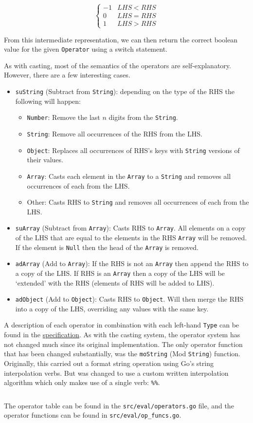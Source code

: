 \[ \begin{cases} 
    -1 & LHS < RHS \\
    0  & LHS = RHS \\
    1  & LHS > RHS 
 \end{cases}
\]

From this intermediate representation, we can then return the correct boolean value for the given \verb|Operator| using a switch statement.

As with casting, most of the semantics of the operators are self-explanatory. However, there are a few interesting cases.

\begin{itemize}
    \item \verb|suString| (Subtract from \verb|String|): depending on the type of the RHS the following will happen:
    \begin{itemize}
        \item \verb|Number|: Remove the last $n$ digits from the \verb|String|.
        \item \verb|String|: Remove all occurrences of the RHS from the LHS.
        \item \verb|Object|: Replaces all occurrences of RHS's keys with \verb|String| versions of their values.
        \item \verb|Array|: Casts each element in the \verb|Array| to a \verb|String| and removes all occurrences of each from the LHS.
        \item Other: Casts RHS to \verb|String| and removes all occurrences of each from the LHS.
    \end{itemize}
    \item \verb|suArray| (Subtract from \verb|Array|): Casts RHS to \verb|Array|. All elements on a copy of the LHS that are equal to the elements in the RHS \verb|Array| will be removed. If the element is \verb|Null| then the head of the \verb|Array| is removed.
    \item \verb|adArray| (Add to \verb|Array|): If the RHS is not an \verb|Array| then append the RHS to a copy of the LHS. If RHS is an \verb|Array| then a copy of the LHS will be `extended' with the RHS (elements of RHS will be added to LHS).
    \item \verb|adObject| (Add to \verb|Object|): Casts RHS to \verb|Object|. Will then merge the RHS into a copy of the LHS, overriding any values with the same key.
\end{itemize}

A description of each operator in combination with each left-hand \verb|Type| can be found in the \hyperref[sec:operatorvaluerel]{specification}. As with the casting system, the operator system has not changed much since its original implementation. The only operator function that has been changed substantially, was the \verb|moString| (Mod \verb|String|) function. Originally, this carried out a format string operation using Go's string interpolation verbs\textsuperscript{\cite{go_fmt_package}}. But was changed to use a custom written interpolation algorithm which only makes use of a single verb: \verb|%%|.
\label{sec:explanation-mod-string-interpolation}

\inputminted[firstline=185, lastline=233, autogobble, breaklines, tabsize=4]{go}{../../src/eval/op_funcs.go}

The operator table can be found in the \verb|src/eval/operators.go| file, and the operator functions can be found in \verb|src/eval/op_funcs.go|.
